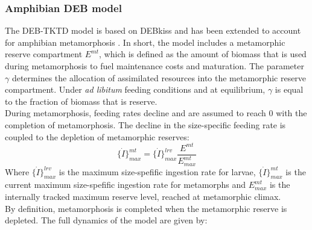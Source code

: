 \documentclass[preprint,12pt]{elsarticle}
\begin{document}
\subsubsection{Amphibian DEB model}
%
The DEB-TKTD model is based on DEBkiss \citep{jagerDEBkissQuestSimplest2013} 
and has been extended to account for amphibian metamorphosis \citep{hansulDynamicEnergyBudget2026}. 
In short, the model includes a metamorphic reserve compartment $E^{mt}$, 
which is defined as the amount of biomass that is used during metamorphosis to fuel 
maintenance costs and maturation. 
The parameter $\gamma$ determines the allocation of assimilated resources into the metamorphic reserve 
compartment. 
Under \textit{ad libitum} feeding conditions and at equilibrium, 
$\gamma$ is equal to the fraction of biomass that is reserve.\\
During metamorphosis, feeding rates decline and are assumed to reach 0 with the completion of metamorphosis. 
The decline in the size-specific feeding rate is coupled to the depletion of metamorphic reserves:
%
\begin{equation}
    \{ \dot{I} \}_{max}^{mt} = \{ \dot{I} \}_{max}^{lrv} \dfrac{E^{mt}}{E^{mt}_{max}}  
    \label{eq:dI_mt}
\end{equation}
%
Where  $\{ \dot{I} \}_{max}^{lrv}$ is the maximum size-spefific ingestion rate for larvae,
$\{ \dot{I} \}_{max}^{mt}$ is the current maximum size-spefific ingestion rate for metamorphs 
and $E^{mt}_{max}$ is the internally tracked maximum reserve level, 
reached at metamorphic climax.\\
By definition, metamorphosis is completed when the metamorphic reserve is depleted. 
The full dynamics of the model \citep{hansulDynamicEnergyBudget2026} are given by:
\end{document}
